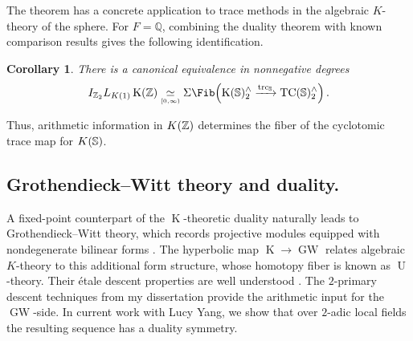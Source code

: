 \documentclass[11pt]{article}
\newtheorem{corollary}[theorem]{Corollary}
\newcommand{\K}{\operatorname{K}}
\newcommand{\GW}{\operatorname{GW}}
\begin{document}
The theorem has a concrete application to trace methods in the algebraic $K$-theory of the sphere.
For $F=\mathbb Q$, combining the duality theorem with known comparison results gives the following identification.
\begin{corollary}
There is a canonical equivalence in nonnegative degrees
\begin{equation*}
I_{\bZ_2}L_{K(1)}\K(\bZ) \mathrel{\underset{\scriptscriptstyle [0,\infty)}{\simeq}} \Sigma \Fib\!\left( \K(\bS)_2^\w \xrightarrow{\operatorname{trc}_{\bS}} \operatorname{TC}(\bS)_2^\w \right).
\end{equation*}
\end{corollary}
Thus, arithmetic information in $K(\mathbb{Z})$ determines the fiber of the cyclotomic trace map for $K(\mathbb{S})$.


\subsection{Grothendieck--Witt theory and  duality.}
A fixed-point counterpart of the $\K$-theoretic duality naturally leads to Grothendieck--Witt theory, which records projective modules equipped with nondegenerate bilinear forms \cite{CDH}.
The hyperbolic map $\K\to\GW$ relates algebraic $K$-theory to this additional form structure, whose homotopy fiber is known as $\operatorname{U}$-theory.
Their étale descent properties are well understood \cite{MR3341783,MR2811711}.
The $2$-primary descent techniques from my dissertation provide the arithmetic input for the $\GW$-side.
In current work with Lucy Yang, we show that over $2$-adic local fields the resulting sequence has a duality symmetry.
\end{document}
